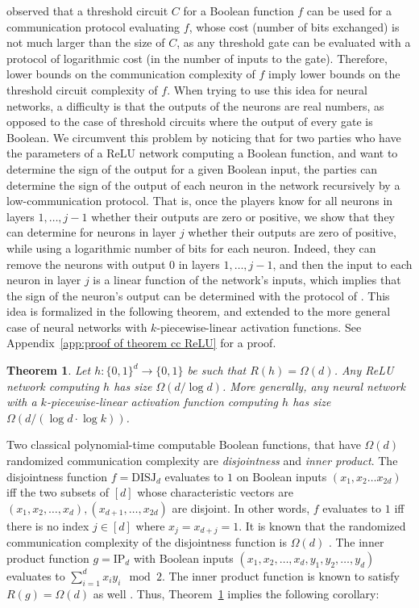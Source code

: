 \documentclass[11pt]{article}
\newtheorem{theorem}{Theorem}[section]
\begin{document}
\cite{nisan1993communication} observed that a threshold circuit $C$ for a Boolean function $f$ can be used for a communication protocol evaluating $f$, whose cost (number of bits exchanged) is not much larger than the size of $C$, as any threshold gate can be evaluated with a protocol of logarithmic cost (in the number of inputs to the gate). 
Therefore, lower bounds on the communication complexity of $f$ imply lower bounds on the threshold circuit complexity of $f$. When trying to use this idea for neural networks, a difficulty is that the outputs of the neurons are real numbers, as opposed to the case of threshold circuits where the output of every gate is Boolean. We circumvent this problem by noticing that for two parties who have the parameters of a ReLU network computing a Boolean function, and want to determine the sign of the output for a given Boolean input,
the parties can determine the sign of the output of each neuron in the network recursively by a low-communication protocol. That is, once the players know for all neurons in layers $1,\ldots,j-1$ whether their outputs are zero or positive, we show that they can determine for neurons in layer $j$ whether their outputs are zero of positive, while using a logarithmic number of bits for each neuron.
Indeed, they can remove the neurons with output $0$ in layers $1,\ldots,j-1$, and then the input to each neuron in layer $j$ is a linear function of the network's inputs, which implies that the sign of the neuron's output can be determined with the protocol of \cite{nisan1993communication}.
This idea is formalized in the following theorem, and extended to the more general case of neural networks with $k$-piecewise-linear activation functions. See Appendix~\ref{app:proof of theorem cc ReLU} for a proof.

\begin{theorem}
\label{thm:CC_ReLU}
    Let $h:\{0,1\}^d \rightarrow \{0,1\}$ be such that $R(h)=\Omega(d)$.
	Any ReLU network computing $h$ has size $\Omega(d/\log d)$. More generally, any neural network with a $k$-piecewise-linear activation function computing $h$ has size $\Omega(d/(\log d \cdot \log k))$.
\end{theorem}

Two classical polynomial-time computable Boolean functions, 
that have 
$\Omega(d)$ randomized communication complexity are \emph{disjointness} and \emph{inner product}.  
The disjointness function $f=\text{DISJ}_d$ evaluates to $1$ on Boolean inputs $(x_1,x_2 \ldots x_{2d})$ iff the two subsets of $[d]$ whose characteristic vectors are $(x_1,x_2, \ldots, x_{d}), (x_{d+1},\ldots, x_{2d})$ are disjoint. In other words, $f$ evaluates to $1$ iff there is no index $j \in [d]$ where $x_j=x_{d+j}=1$. It is known that the randomized communication complexity of the disjointness function is $\Omega(d)$ \citep{kalyanasundaram1992probabilistic,razborov1992distributional,bar2004information}.
The inner product function $g=\text{IP}_d$ with Boolean inputs $(x_1,x_2, \ldots, x_{d},y_1,y_2, \ldots, y_{d})$ evaluates to $\sum_{i=1}^d x_i y_i \mod 2$. The inner product function is known to satisfy
$R(g)=\Omega(d)$ as well \citep{babai1986complexity}. 
Thus, Theorem~\ref{thm:CC_ReLU} implies the following corollary:
\end{document}
